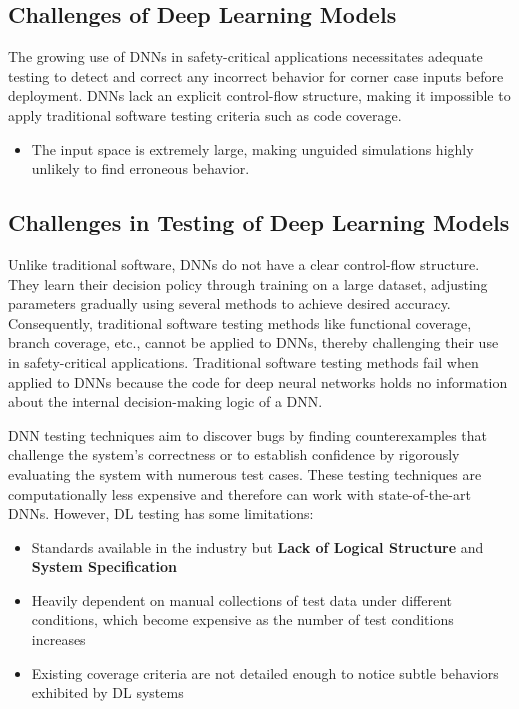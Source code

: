 \subsection{Challenges of Deep Learning Models}

The growing use of DNNs in safety-critical applications necessitates adequate testing to detect and correct any incorrect behavior for corner case inputs before deployment. DNNs lack an explicit control-flow structure, making it impossible to apply traditional software testing criteria such as code coverage.

\begin{itemize}
	\item The input space is extremely large, making unguided simulations highly unlikely to find erroneous behavior.
\end{itemize}
\subsection{Challenges in Testing of Deep Learning Models}

Unlike traditional software, DNNs do not have a clear control-flow structure. They learn their decision policy through training on a large dataset, adjusting parameters gradually using several methods to achieve desired accuracy. Consequently, traditional software testing methods like functional coverage, branch coverage, etc., cannot be applied to DNNs, thereby challenging their use in safety-critical applications. Traditional software testing methods fail when applied to DNNs because the code for deep neural networks holds no information about the internal decision-making logic of a DNN.

DNN testing techniques aim to discover bugs by finding counterexamples that challenge the system's correctness or to establish confidence by rigorously evaluating the system with numerous test cases. These testing techniques are computationally less expensive and therefore can work with state-of-the-art DNNs. However, DL testing has some limitations:
\begin{itemize}
    \item Standards available in the industry but \textbf{Lack of Logical Structure} and \textbf{System Specification}
    \item Heavily dependent on manual collections of test data under different conditions, which become expensive as the number of test conditions increases
    \item Existing coverage criteria are not detailed enough to notice subtle behaviors exhibited by DL systems
\end{itemize}

